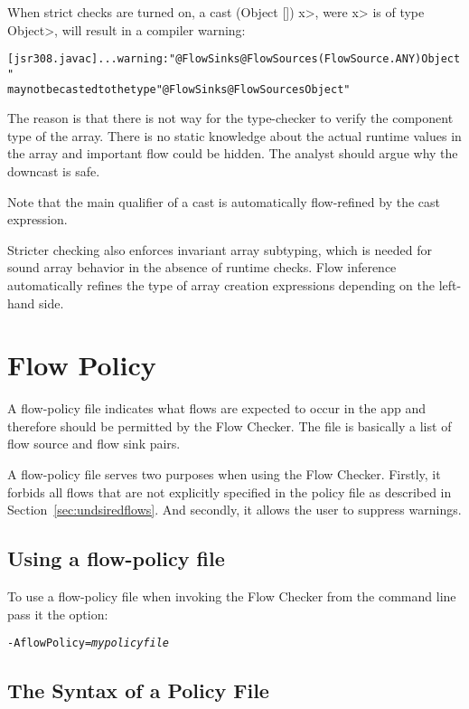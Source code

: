 When strict checks are turned on,
a cast \<(Object []) x>, were \<x> is of type \<Object>, will result
in a compiler warning:

\begin{alltt}
[jsr308.javac] ... warning: "@FlowSinks @FlowSources({FlowSource.ANY}) Object"
       may not be casted to the type "@FlowSinks @FlowSources Object"
\end{alltt}

The reason is that there is not way for the type-checker to verify
 the component type of the array. There is no static knowledge about the actual
runtime values in the array and important flow could be hidden.
The analyst should argue why the downcast is safe.

Note that the main qualifier of a cast is automatically flow-refined
by the cast expression.


\medskip

Stricter checking also enforces invariant array subtyping, which is
needed for sound array behavior in the absence of runtime checks.
Flow inference automatically refines the type of array creation
expressions depending on the left-hand side.

\section{Flow Policy}
\label{sec:flowpolicy}

A flow-policy file indicates what flows are expected to occur in the app
 and therefore should be permitted by the Flow Checker.  The file is basically a list 
 of flow source and flow sink pairs.

A flow-policy file serves two purposes when using the Flow Checker.
Firstly, it forbids all flows that are not explicitly specified in the policy file as described
in Section~\ref{sec:undsiredflows}.  And secondly, it allows the user to  
suppress warnings.

\subsection{Using a flow-policy file}
To use a flow-policy file when invoking the Flow Checker from the
command line pass it the option:
\begin{alltt}
-AflowPolicy=\emph{mypolicyfile}
\end{alltt}

\subsection{The Syntax of a Policy File}

